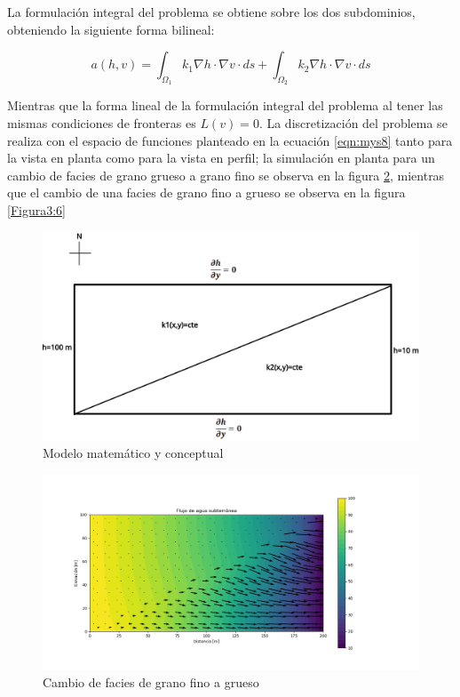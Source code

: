 La formulación integral del problema se obtiene sobre los dos subdominios, obteniendo la siguiente forma bilineal:

\begin{equation}
 \label{eqn:mys18}
 a(h,v)=\int_{\Omega_{1}}^{} k_{1}{\nabla}h{\cdot}{\nabla}v \cdot ds+\int_{\Omega_{2}}^{} k_{2}{\nabla}h{\cdot}{\nabla}v \cdot ds
\end{equation} 

Mientras que la forma lineal de la formulación integral del problema al tener las mismas condiciones de fronteras es $L(v)=0$. La discretización del problema se realiza con el espacio de funciones planteado en la ecuación \ref{eqn:mys8} tanto para la vista en planta como para la vista en perfil; la simulación en planta para un cambio de facies de grano grueso a grano fino se observa en la figura \ref{Figura3:5}, mientras que el cambio de una facies de grano fino a grueso se observa en la figura \ref{Figura3:6}

\begin{figure}[H]
\centering
\includegraphics[scale=0.27]{Figura_25d.png}
\caption{ Modelo matemático y conceptual}
\label{Figura3:7a}
\end{figure}

 \begin{figure}[H]
\centering
\includegraphics[scale=0.55]{Figura_31.png}
\caption{ Cambio de facies de grano fino a grueso}
\label{Figura3:5}
\end{figure}

